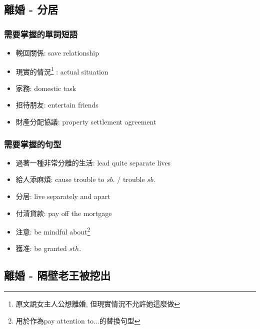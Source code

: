 \subsection{離婚 - 分居}
\subsubsection*{需要掌握的單詞短語}
\begin{multicols}{2}
\begin{itemize}
  \itemsep0em
  \item 輓回關係: save relationship
  \item 現實的情況\footnote{原文說女主人公想離婚, 但現實情況不允許她這麼做} : actual situation
  \item 家務: domestic task
  \item 招待朋友: entertain friends
  \item 財產分配協議: property settlement agreement
\end{itemize}
\end{multicols}

\subsubsection*{需要掌握的句型}
\begin{multicols}{2}
\begin{itemize}
  \itemsep0em
  \item 過著一種非常分離的生活: lead quite separate lives
  \item 給人添麻煩: cause trouble to $sb.$ / trouble $sb.$
  \item 分居: live separately and apart
  \item 付清貸款: pay off the mortgage
  \item 注意: be mindful about\footnote{用於作為pay attention to...的替換句型}
  \item 獲准: be granted $sth.$
\end{itemize}
\end{multicols}

\subsection{離婚 - 隔壁老王被挖出}
